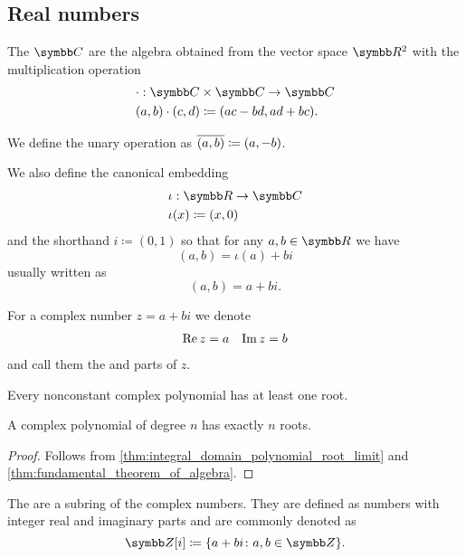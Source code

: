 \subsection{Real numbers}\label{subsec:real_numbers}

\begin{definition}\label{def:complex_numbers}
  The  \( \Co \) are the algebra obtained from the vector space \( \R^2 \) with the multiplication operation
  \begin{align*}
    &\cdot: \Co \times \Co \to \Co \\
    &(a, b) \cdot (c, d) \coloneqq (ac - bd, ad + bc).
  \end{align*}

  We define the unary  operation as \( \overline{(a, b)} \coloneqq (a, -b) \).

  We also define the canonical embedding
  \begin{align*}
    &\iota: \R \to \Co \\
    &\iota(x) \coloneqq (x, 0)
  \end{align*}
  and the shorthand \( i \coloneqq (0, 1) \) so that for any \( a, b \in \R \) we have
  \begin{equation*}
    (a, b) = \iota(a) + bi
  \end{equation*}
  usually written as
  \begin{equation*}
    (a, b) = a + bi.
  \end{equation*}

  For a complex number \( z = a + bi \) we denote
  \begin{align*}
    \operatorname{Re} z = a && \operatorname{Im} z = b
  \end{align*}
  and call them the  and  parts of \( z \).
\end{definition}

\begin{theorem}\label{thm:fundamental_theorem_of_algebra}
  Every nonconstant complex polynomial has at least one root.
\end{theorem}

\begin{corollary}\label{thm:complex_polynomials_have_n_roots}
  A complex polynomial of degree \( n \) has exactly \( n \) roots.
\end{corollary}
\begin{proof}
  Follows from \cref{thm:integral_domain_polynomial_root_limit} and \cref{thm:fundamental_theorem_of_algebra}.
\end{proof}

\begin{definition}\label{def:gaussian_integers}
  The  are a subring of the complex numbers. They are defined as numbers with integer real and imaginary parts and are commonly denoted as
  \begin{equation*}
    \Z[i] \coloneqq \{ a + bi \colon a, b \in \Z \}.
  \end{equation*}
\end{definition}
